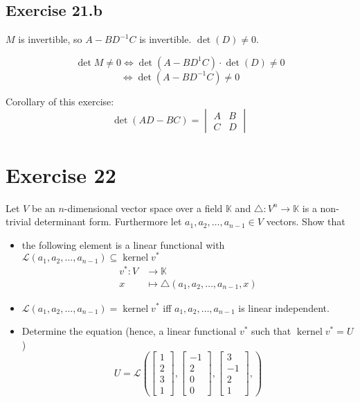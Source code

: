 \documentclass[a4paper]{article}
\theoremstyle{definition}
\DeclareMathOperator\kernel{kernel}
\begin{document}
\subsection{Exercise 21.b}
$M$ is invertible, so $A - BD^{-1} C$ is invertible.
$\det(D) \neq 0$.

\[ \det{M} \neq 0 \Leftrightarrow \det(A - BD^{1} C) \cdot \det(D) \neq 0 \]
\[ \Leftrightarrow \det(A - BD^{-1} C) \neq 0 \]

Corollary of this exercise:
\[ \det(AD - BC) = \begin{vmatrix} A & B \\ C & D \end{vmatrix} \]

\section{Exercise 22}
\begin{ex}
  Let $V$ be an $n$-dimensional vector space over a field $\mathbb K$
  and $\triangle: V^n \to \mathbb K$ is a non-trivial determinant form.
  Furthermore let $a_1, a_2, \ldots, a_{n-1} \in V$ vectors.
  Show that
  \begin{itemize}
    \item
      the following element is a linear functional
      with $\mathcal L(a_1, a_2, \ldots, a_{n-1}) \subseteq \kernel{v^*}$
      \begin{align*}
        v^*: V &\to \mathbb K \\
             x &\mapsto \triangle(a_1, a_2, \ldots, a_{n-1}, x)
      \end{align*}
    \item
      $\mathcal L(a_1, a_2, \ldots, a_{n-1}) = \kernel{v^*}$ iff $a_1, a_2, \ldots, a_{n-1}$
      is linear independent.
    \item
      Determine the equation (hence, a linear functional $v^*$ such that $\kernel{v^*} = U$)
      \[
        U = \mathcal L\left(
          \begin{bmatrix} 1 \\ 2 \\ 3 \\ 1 \end{bmatrix},
          \begin{bmatrix} -1 \\ 2 \\ 0 \\ 0 \end{bmatrix},
          \begin{bmatrix} 3 \\ -1 \\ 2 \\ 1 \end{bmatrix},
        \right)
      \]
  \end{itemize}
\end{ex}
\end{document}
